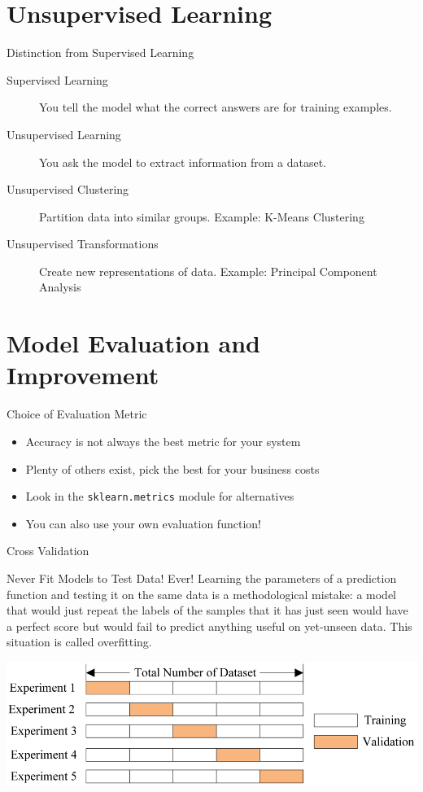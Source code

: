 \documentclass{lug}
\begin{document}
\section{Unsupervised Learning}
\begin{frame}{Distinction from Supervised Learning}
  \begin{description}
    \item[Supervised Learning] You tell the model what the correct answers are for training examples.
    \item[Unsupervised Learning] You ask the model to extract information from a dataset.
    \item[Unsupervised Clustering] Partition data into similar groups. Example: K-Means Clustering
    \item[Unsupervised Transformations] Create new representations of data. Example: Principal Component Analysis
  \end{description}
\end{frame}

\section{Model Evaluation and Improvement}
\begin{frame}{Choice of Evaluation Metric}
  \begin{itemize}[<+->]
    \item Accuracy is not always the best metric for your system
    \item Plenty of others exist, pick the best for your business costs
    \item Look in the \texttt{sklearn.metrics} module for alternatives
    \item You can also use your own evaluation function!
  \end{itemize}
\end{frame}

\begin{frame}{Cross Validation}
  \begin{block}{Never Fit Models to Test Data! Ever!}
  Learning the parameters of a prediction function and testing it on the same data is a methodological mistake: a model that would just repeat the
  labels of the samples that it has just seen would have a perfect score but would fail to predict anything useful on yet-unseen data. This situation
  is called overfitting.
  \end{block}

  \includegraphics[width=\linewidth]{graphics/cv-explained}
\end{frame}
\end{document}
